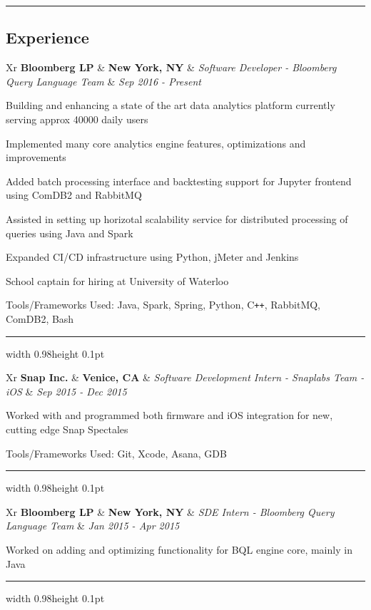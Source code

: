 \documentclass[11pt,letterpaper]{article}
\newcommand{\subsectioncustomend}[1]
{
\vspace{-0.8em}
\subsection*{#1}
}
\newcommand{\subsectioncustom}[1]
{
\hrule
\subsectioncustomend{#1}
}
\newcommand{\worksectionend}[5]
{
\begin{tabularx}{\textwidth}{Xr}
\textbf{#1}
&
\textbf{#2}
&
\emph{#3}
&
\emph{#4}
\end{tabularx}
\vspace{-1.2em}
{#5}
}
\newcommand{\worksection}[5]
{
\worksectionend{#1}{#2}{#3}{#4}{#5}
\vspace{-1.2em}
\textcolor{greyish}{\hrule width 0.98\textwidth height 0.1pt}
}
\newcommand{\CPP}{C\texttt{++}}
\begin{document}
\subsectioncustom{Experience}

\begin{flushleft}

{
\worksection
    {
        Bloomberg LP
    }
    {
        New York, NY
    }
    {
        Software Developer - Bloomberg Query Language Team
    }
    {
        Sep 2016
        - Present
    }
    {
        \begin{itemize*}
        {
                \item { Building and enhancing a state of the art data analytics platform currently serving approx 40000 daily users }
                \item { Implemented many core analytics engine features, optimizations and improvements }
                \item { Added batch processing interface and backtesting support for Jupyter frontend using ComDB2 and RabbitMQ }
                \item { Assisted in setting up horizotal scalability service for distributed processing of queries using Java and Spark }
                \item { Expanded CI/CD infrastructure using Python, jMeter and Jenkins }
                \item { School captain for hiring at University of Waterloo }
                \item { Tools/Frameworks Used: Java, Spark, Spring, Python, \CPP, RabbitMQ, ComDB2, Bash }
        }
        \end{itemize*}
    }
}
{
\worksection
    {
        Snap Inc.
    }
    {
        Venice, CA
    }
    {
        Software Development Intern - Snaplabs Team - iOS
    }
    {
        Sep 2015
        - Dec 2015
    }
    {
        \begin{itemize*}
        {
                \item { Worked with and programmed both firmware and iOS integration for new, cutting edge Snap Spectales }
                \item { Tools/Frameworks Used: Git, Xcode, Asana, GDB }
        }
        \end{itemize*}
    }
}
{
\worksection
    {
        Bloomberg LP
    }
    {
        New York, NY
    }
    {
        SDE Intern - Bloomberg Query Language Team
    }
    {
        Jan 2015
        - Apr 2015
    }
    {
        \begin{itemize*}
        {
                \item { Worked on adding and optimizing functionality for BQL engine core, mainly in Java }
}
\end{itemize*}}}
\end{flushleft}
\end{document}
